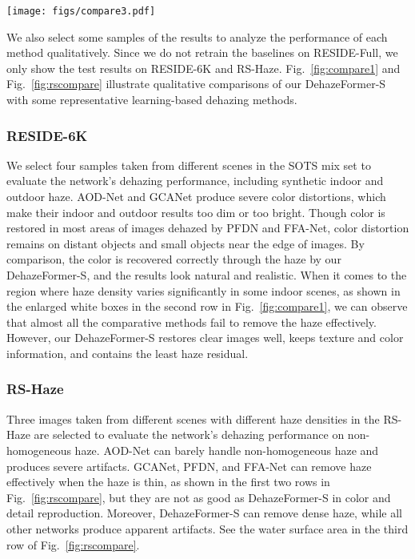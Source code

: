 \documentclass[journal]{IEEEtran}
\begin{document}
\begin{figure*}[!t]
  \centering
  \texttt{[image: figs/compare3.pdf]}
  \caption{
    Qualitative comparison of image dehazing methods on RS-Haze.
    The first column is the hazy images and the last column is the ground truth.
  }
  \label{fig:rscompare}
\end{figure*}

We also select some samples of the results to analyze the performance of each method qualitatively.
Since we do not retrain the baselines on RESIDE-Full, we only show the test results on RESIDE-6K and RS-Haze.
Fig.~\ref{fig:compare1} and Fig.~\ref{fig:rscompare} illustrate qualitative comparisons of our DehazeFormer-S with some representative learning-based dehazing methods. 

\subsubsection{RESIDE-6K}
We select four samples taken from different scenes in the SOTS mix set to evaluate the network's dehazing performance, including synthetic indoor and outdoor haze. 
AOD-Net and GCANet produce severe color distortions, which make their indoor and outdoor results too dim or too bright.
Though color is restored in most areas of images dehazed by PFDN and FFA-Net, color distortion remains on distant objects and small objects near the edge of images. 
By comparison, the color is recovered correctly through the haze by our DehazeFormer-S, and the results look natural and realistic.
When it comes to the region where haze density varies significantly in some indoor scenes, as shown in the enlarged white boxes in the second row in Fig.~\ref{fig:compare1}, we can observe that almost all the comparative methods fail to remove the haze effectively. 
However, our DehazeFormer-S restores clear images well, keeps texture and color information, and contains the least haze residual.

\subsubsection{RS-Haze}
Three images taken from different scenes with different haze densities in the RS-Haze are selected to evaluate the network's dehazing performance on non-homogeneous haze. 
AOD-Net can barely handle non-homogeneous haze and produces severe artifacts.
GCANet, PFDN, and FFA-Net can remove haze effectively when the haze is thin, as shown in the first two rows in Fig.~\ref{fig:rscompare}, but they are not as good as DehazeFormer-S in color and detail reproduction.
Moreover, DehazeFormer-S can remove dense haze, while all other networks produce apparent artifacts. 
See the water surface area in the third row of Fig.~\ref{fig:rscompare}.
\end{document}
